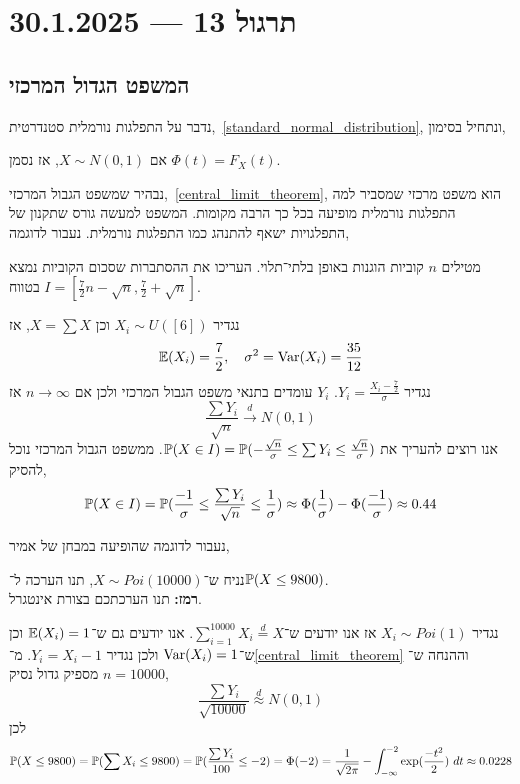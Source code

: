 \section{תרגול 13 --- 30.1.2025}
\subsection{המשפט הגדול המרכזי}
נדבר על התפלגות נורמלית סטנדרטית,\ \ref{standard_normal_distribution}, ונתחיל בסימון,
\begin{notation}
	אם $X \sim N(0, 1)$, אז נסמן $\Phi(t) = F_X(t)$.
\end{notation}
נבהיר שמשפט הגבול המרכזי,\ \ref{central_limit_theorem}, הוא משפט מרכזי שמסביר למה התפלגות נורמלית מופיעה בכל כך הרבה מקומות.
המשפט למעשה גורס שתקנון של התפלגויות ישאף להתנהג כמו התפלגות נורמלית.
נעבור לדוגמה,
\begin{exercise}
	מטילים $n$ קוביות הוגנות באופן בלתי־תלוי.
	העריכו את ההסתברות שסכום הקוביות נמצא בטווח $I = [\frac{7}{2}n - \sqrt{n}, \frac{7}{2} + \sqrt{n}]$.
\end{exercise}
\begin{solution}
	נגדיר $X_i \sim U([6])$ וכן $X = \sum X$, אז
	\[
		\mathbb{E}(X_i) = \frac{7}{2},
		\quad
		\sigma^2 = \operatorname{Var}(X_i) = \frac{35}{12}
	\]
	נגדיר $Y_i = \frac{X_i - \frac{7}{2}}{\sigma}$.
	$Y_i$ עומדים בתנאי משפט הגבול המרכזי ולכן אם $n \to \infty$ אז
	\[
		\frac{\sum Y_i}{\sqrt{n}} \xrightarrow{d} N(0, 1)
	\]
	אנו רוצים להעריך את $\mathbb{P}(X \in I) = \mathbb{P}(-\frac{\sqrt{n}}{\sigma} \le \sum Y_i \le \frac{\sqrt{n}}{\sigma})$.
	ממשפט הגבול המרכזי נוכל להסיק,
	\[
		\mathbb{P}(X \in I)
		= \mathbb{P}(\frac{-1}{\sigma} \le \frac{\sum Y_i}{\sqrt{n}} \le \frac{1}{\sigma})
		\approx \Phi(\frac{1}{\sigma}) - \Phi(\frac{-1}{\sigma})
		\approx 0.44
	\]
\end{solution}
נעבור לדוגמה שהופיעה במבחן של אמיר,
\begin{exercise}
	נניח ש־$X \sim Poi(10000)$,
	תנו הערכה ל־$\mathbb{P}(X \le 9800)$. \\
	\textbf{רמז:} תנו הערכתכם בצורת אינטגרל.
\end{exercise}
\begin{solution}
	נגדיר $X_i \sim Poi(1)$ אז אנו יודעים ש־$\sum_{i = 1}^{10000} X_i \overset{d}{=} X$.
	אנו יודעים גם ש־$\mathbb{E}(X_i) = 1$ וכן ש־$\operatorname{Var}(X_i) = 1$ ולכן נגדיר $Y_i = X_i - 1$.
	מ־\ref{central_limit_theorem} וההנחה ש־$n = 10000$ מספיק גדול נסיק,
	\[
		\frac{\sum Y_i}{\sqrt{10000}}
		\overset{d}{\approx} N(0, 1)
	\]
	לכן
	\[
		\mathbb{P}(X \le 9800)
		= \mathbb{P}(\sum X_i \le 9800)
		= \mathbb{P}(\frac{\sum Y_i}{100} \le -2)
		= \Phi(-2)
		= \frac{1}{\sqrt{2\pi}} - \int_{-\infty}^{-2} \exp(\frac{-t^2}{2})\ dt
		\approx 0.0228
	\]
\end{solution}

